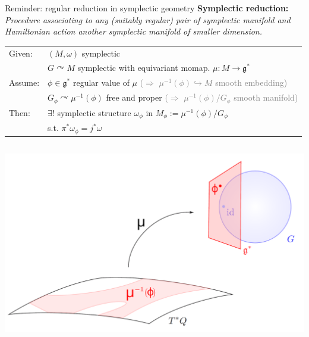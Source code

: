 \documentclass[beamer,10pt,handout]{standalone}  \Handouttrue
\begin{document}
\begin{frame}{Reminder: regular reduction in symplectic geometry}
	\textbf{\color{UniGreen}Symplectic reduction:}~~
	\\ 
	{\it \small
	Procedure associating to any (suitably regular) pair of symplectic manifold and Hamiltonian action another symplectic manifold of smaller dimension.}
	\vfill
	\pause
	\begin{thmblock}
		\vspace{-.4em}\hspace{-1em}
		\begin{tabular}{l p{14cm}}
		    Given: & $(M,\omega)$ symplectic
		    \\
		    & $G\curvearrowright M$ symplectic with equivariant momap. $\mu:M\to \mathfrak{g}^*$
		    \\[.2em]
		    Assume: & $\phi \in \mathfrak{g}^*$ regular value of $\mu$ 
		    \qquad\quad \footnotesize \textcolor{gray}{($\Rightarrow$ $\mu^{-1}(\phi)\hookrightarrow M$ smooth embedding)}
		    \\
			& $G_\phi\curvearrowright \mu^{-1}(\phi)$ free and proper
			\quad \footnotesize \textcolor{gray}{($\Rightarrow$ $\mu^{-1}(\phi)/G_\phi$ smooth manifold)}
			\\[.4em]
			Then: & $\exists!$ symplectic structure $\omega_\phi$ in $M_\phi:= \mu^{-1}(\phi)/G_\phi$ \\
			& s.t. $\pi^\ast \omega_\phi = j^\ast \omega$ 
			\qquad {\footnotesize with $j:\mu^{-1}(\phi) \hookrightarrow M$ and $\pi:\mu^{-1}(\phi)\twoheadrightarrow M_\mu$}
		\end{tabular}
		\vspace{-.4em}
	\end{thmblock}
	\vfill
	\pause
	\begin{columns}
		\begin{column}{0.40\textwidth}
			\includegraphics[width=\textwidth]{Pictures/Reduction}
		\end{column}	
		

\end{columns}
\end{frame}
\end{document}
